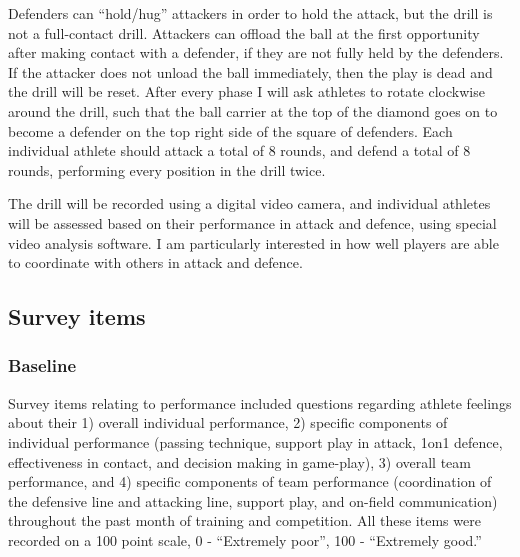 Defenders can “hold/hug” attackers in order to hold the attack, but the drill is not a full-contact drill.  Attackers can offload the ball at the first opportunity after making contact with a defender, if they are not fully held by the defenders.  If the attacker does not unload the ball immediately, then the play is dead and the drill will be reset.
After every phase I will ask athletes to rotate clockwise around the drill, such that the ball carrier at the top of the diamond goes on to become a defender on the top right side of the square of defenders. Each individual athlete should attack a total of 8 rounds, and defend a total of 8 rounds, performing every position in the drill twice.

The drill will be recorded using a digital video camera, and individual athletes will be assessed based on their performance in attack and defence, using special video analysis software. I am particularly interested in how well players are able to coordinate with others in attack and defence.





\subsection{\label{app6:surveyItems}Survey items}



\subsubsection{\label{app6:surveyItemsBaseline}Baseline}

Survey items relating to performance included questions regarding athlete feelings about their 1) overall individual performance, 2) specific components of individual performance (passing technique, support play in attack, 1on1 defence, effectiveness in contact, and decision making in game-play), 3) overall team performance, and 4) specific components of team performance (coordination of the defensive line and attacking line, support play, and on-field communication) throughout the past month of training and competition.  All these items were recorded on a 100 point scale, 0 - ``Extremely poor'', 100 - ``Extremely good.''

